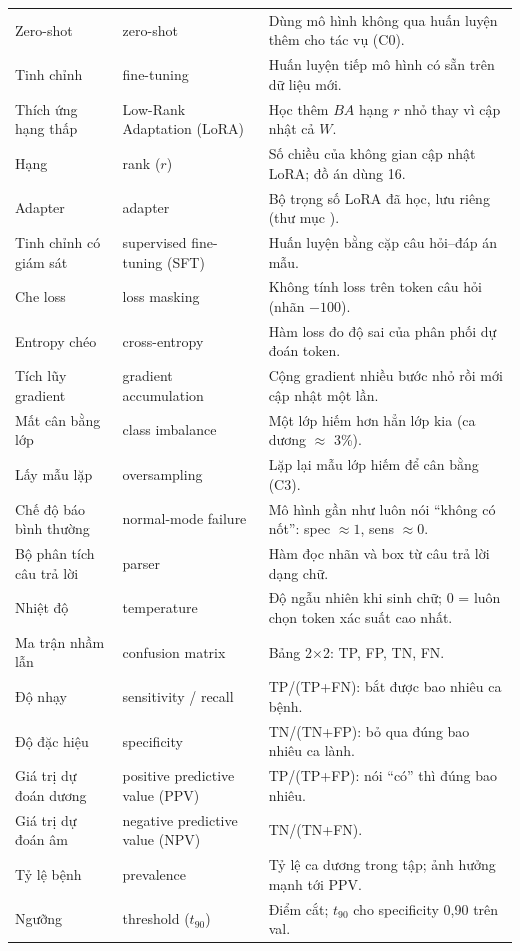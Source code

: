 \begin{center}
\begin{longtable}{@{}P{3.6cm}P{3.6cm}P{7.4cm}@{}}
Zero-shot & zero-shot & Dùng mô hình không qua huấn luyện thêm cho tác vụ (C0). \\
Tinh chỉnh & fine-tuning & Huấn luyện tiếp mô hình có sẵn trên dữ liệu mới. \\
Thích ứng hạng thấp & Low-Rank Adaptation (LoRA) & Học thêm $BA$ hạng $r$ nhỏ thay vì cập nhật cả $W$. \\
Hạng & rank ($r$) & Số chiều của không gian cập nhật LoRA; đồ án dùng 16. \\
Adapter & adapter & Bộ trọng số LoRA đã học, lưu riêng (thư mục ). \\
Tinh chỉnh có giám sát & supervised fine-tuning (SFT) & Huấn luyện bằng cặp câu hỏi--đáp án mẫu. \\
Che loss & loss masking & Không tính loss trên token câu hỏi (nhãn $-100$). \\
Entropy chéo & cross-entropy & Hàm loss đo độ sai của phân phối dự đoán token. \\
Tích lũy gradient & gradient accumulation & Cộng gradient nhiều bước nhỏ rồi mới cập nhật một lần. \\
Mất cân bằng lớp & class imbalance & Một lớp hiếm hơn hẳn lớp kia (ca dương $\approx$ 3\%). \\
Lấy mẫu lặp & oversampling & Lặp lại mẫu lớp hiếm để cân bằng (C3). \\
Chế độ báo bình thường & normal-mode failure & Mô hình gần như luôn nói ``không có nốt'': spec $\approx 1$, sens $\approx 0$. \\
Bộ phân tích câu trả lời & parser & Hàm đọc nhãn và box từ câu trả lời dạng chữ. \\
Nhiệt độ & temperature & Độ ngẫu nhiên khi sinh chữ; 0 = luôn chọn token xác suất cao nhất. \\
Ma trận nhầm lẫn & confusion matrix & Bảng 2$\times$2: TP, FP, TN, FN. \\
Độ nhạy & sensitivity / recall & TP/(TP+FN): bắt được bao nhiêu ca bệnh. \\
Độ đặc hiệu & specificity & TN/(TN+FP): bỏ qua đúng bao nhiêu ca lành. \\
Giá trị dự đoán dương & positive predictive value (PPV) & TP/(TP+FP): nói ``có'' thì đúng bao nhiêu. \\
Giá trị dự đoán âm & negative predictive value (NPV) & TN/(TN+FN). \\
Tỷ lệ bệnh & prevalence & Tỷ lệ ca dương trong tập; ảnh hưởng mạnh tới PPV. \\
Ngưỡng & threshold ($t_{90}$) & Điểm cắt; $t_{90}$ cho specificity 0,90 trên val. \\

\end{longtable}
\end{center}
